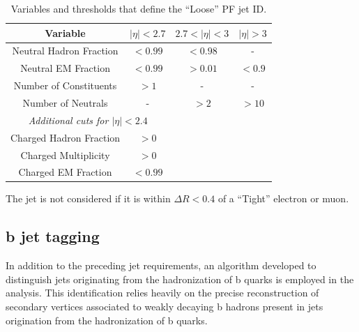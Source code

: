 \begin{table}[!ht]
  \centering
  \begin{tabular}{|c|c|c|c|}
    \hline
    Variable                     &  $|\eta|<2.7$ & $2.7<|\eta|<3$ & $|\eta|>3$ \\
    \hline
    Neutral Hadron Fraction      & $<0.99$       & $<0.98$        & -      \\
    Neutral EM Fraction          & $<0.99$       & $>0.01$        & $<0.9$ \\
    Number of Constituents       & $>1$          & -              & -      \\
    Number of Neutrals           & -             & $>2$           & $>10$  \\
    \hline
    \multicolumn{2}{|c|}{\emph{Additional cuts for $|\eta|<2.4$}} && \\
    \hline
    Charged Hadron Fraction      & $>0$         &&  \\
    Charged Multiplicity         & $>0$         &&  \\
    Charged EM Fraction          & $<0.99$      &&  \\
    \hline
  \end{tabular}
  \caption{Variables and thresholds that define the ``Loose'' PF jet ID.}
  \label{tab:jetid}
\end{table}

The jet is not considered if it is within $\Delta R<0.4$ of a ``Tight'' electron or muon.

\subsection{b jet tagging}
\label{subsec:btag}
In addition to the preceding jet requirements, an algorithm developed to distinguish jets originating from the hadronization of b quarks is employed in the analysis. This identification relies heavily on the precise reconstruction of secondary vertices associated to weakly decaying b hadrons present in jets origination from the hadronization of b quarks.

